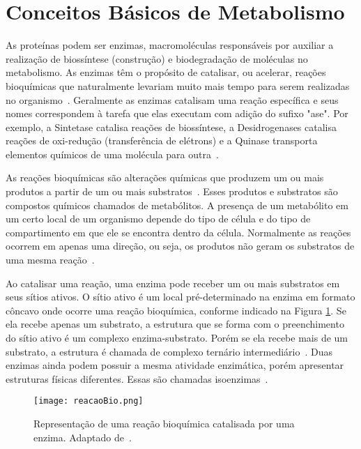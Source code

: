 

\section{Conceitos Básicos de Metabolismo} \label{conceitosMeta}


\indent As proteínas podem ser enzimas, macromoléculas responsáveis por auxiliar a realização de biossíntese (construção) e biodegradação de moléculas no metabolismo. As enzimas têm o propósito de catalisar, ou acelerar, reações bioquímicas que naturalmente levariam muito mais tempo para serem realizadas no organismo~\cite{setubal97}. Geralmente as enzimas catalisam uma reação específica e seus nomes correspondem à tarefa que elas executam com adição do sufixo "ase". Por exemplo, a Sintetase catalisa reações de biossíntese, a Desidrogenases catalisa reações de oxi-redução (transferência de elétrons) e a Quinase transporta elementos químicos de uma molécula para outra~\cite{enzymesKirk}.

\indent As reações bioquímicas são alterações químicas que produzem um ou mais produtos a partir de um ou mais substratos~\cite{lacroixCTS08}. Esses produtos e substratos são compostos químicos chamados de metabólitos. A presença de um metabólito em um certo local de um organismo depende do tipo de célula e do tipo de compartimento em que ele se encontra dentro da célula. Normalmente as reações ocorrem em apenas uma direção, ou seja, os produtos não geram os substratos de uma mesma reação~\cite{lacroixCTS08}.

\indent Ao catalisar uma reação, uma enzima pode receber um ou mais substratos em seus sítios ativos. O sítio ativo é um local pré-determinado na enzima em formato côncavo onde ocorre uma reação bioquímica, conforme indicado na Figura \ref{reacaoBio}. Se ela recebe apenas um substrato, a estrutura que se forma com o preenchimento do sítio ativo é um complexo enzima-substrato. Porém se ela recebe mais de um substrato, a estrutura é chamada de complexo ternário intermediário~\cite{Cap2schomburg}. Duas enzimas ainda podem possuir a mesma atividade enzimática, porém apresentar estruturas físicas diferentes. Essas são chamadas isoenzimas~\cite{Cap2schomburg}.

\begin{figure}[h]
    \centering
    \texttt{[image: reacaoBio.png]}
    \caption{Representação de uma reação bioquímica catalisada por uma enzima. Adaptado de~\cite{reacaoBioUSP}.}
    \label{reacaoBio}
\end{figure}

